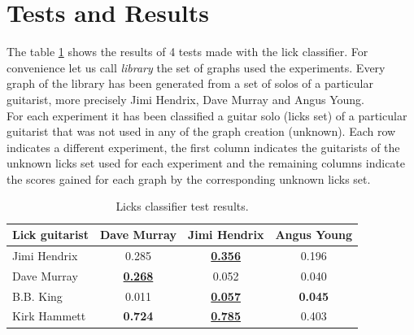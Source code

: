 \documentclass{llncs}
\begin{document}
\section{Tests and Results}
The table \ref{tab:classifier} shows the results of 4 tests
made with the lick classifier. For convenience let us call
\emph{library} the set of graphs used the experiments. Every graph of
the library has been generated from a set of solos of a particular
guitarist, more precisely Jimi Hendrix, Dave Murray and Angus Young.\\
For each experiment it has been classified a
guitar solo (licks set) of a particular guitarist that was not used in
any of the graph creation (unknown). 
Each row indicates a different
experiment, the first column indicates the guitarists of the unknown
licks set used
for each experiment and the remaining columns indicate the scores gained
for each graph by the corresponding unknown licks set. \setlength{\tabcolsep}{8pt}
\begin{table}
\begin{center}
  \begin{tabular}{ l c c c }
    \hline
    Lick guitarist  & Dave Murray & Jimi Hendrix & Angus Young  \\ \hline
	Jimi Hendrix & 0.285 & \underline{\textbf{0.356}} & 0.196 \\
    Dave Murray & \underline{\textbf{0.268}} & 0.052 & 0.040 \\
	B.B. King & 0.011 & \underline{\textbf{0.057}} & \textbf{0.045} \\
	Kirk Hammett & \textbf{0.724} & \underline{\textbf{0.785}} & 0.403 \\
  \end{tabular}
\end{center}
\caption{Licks classifier test results.}
\label{tab:classifier}
\end{table}
\end{document}

